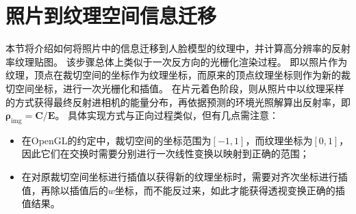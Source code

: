 \section{照片到纹理空间信息迁移}
\label{sec:method_photo2tex}

本节将介绍如何将照片中的信息迁移到人脸模型的纹理中，并计算高分辨率的反射率纹理贴图。
该步骤总体上类似于一次反方向的光栅化渲染过程。
即以照片作为纹理，顶点在裁切空间的坐标作为纹理坐标，而原来的顶点纹理坐标则作为新的裁切空间坐标，进行一次光栅化和插值。
在片元着色阶段，则从照片中以纹理采样的方式获得最终反射进相机的能量分布，再依据预测的环境光照解算出反射率，即$\mathbf{\rho}_\mathrm{img} = \mathbf{C} / \mathbf{E}$。
具体实现方式与正向过程类似，但有几点需注意：
\begin{itemize}
\item 在OpenGL的约定中，裁切空间的坐标范围为$[-1,1]$，而纹理坐标为$[0,1]$，因此它们在交换时需要分别进行一次线性变换以映射到正确的范围；
\item 在对原裁切空间坐标进行插值以获得新的纹理坐标时，需要对齐次坐标进行插值，再除以插值后的$w$坐标，而不能反过来，如此才能获得透视变换正确的插值结果。
\end{itemize}

